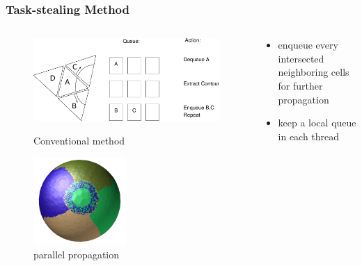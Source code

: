 \documentclass[8pt]{beamer}
\begin{document}
\begin{frame}
  \frametitle{Task-stealing Method %
  }
  \begin{columns}
    \begin{column}{.5\textwidth}
      \begin{figure}[htb]
        \centering
        \includegraphics[width=.8\textwidth]{images/drawing3}
        \caption{Conventional method}
        \includegraphics[width=0.5\textwidth]{images/mt-sphere-propagate.png}
        \caption{parallel propagation}
      \end{figure}
    \end{column}
    \vline{}
    \begin{column}{.5\textwidth}
      \begin{itemize}
      \item enqueue every intersected neighboring cells for further propagation
      \end{itemize}
      \begin{itemize}
      \item keep a local queue in each thread

\end{itemize}
\end{column}
\end{columns}
\end{frame}
\end{document}
